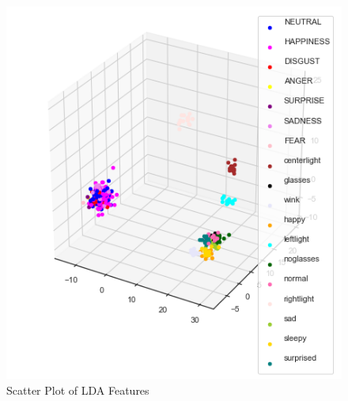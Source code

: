 \documentclass[12pt]{article}
\newenvironment{problem}[2][Problem]{\begin{trivlist}
\item[\hskip \labelsep {\bfseries #1}\hskip \labelsep {\bfseries #2.}]}{\end{trivlist}}
\begin{document}
\begin{problem}{4}
\begin{figure}[H]
	\centering
	\includegraphics[width=16cm]{Scatter_Plot_of_lda.png}
	\caption{Scatter Plot of LDA Features}
\end{figure}


\end{problem}
\end{document}

